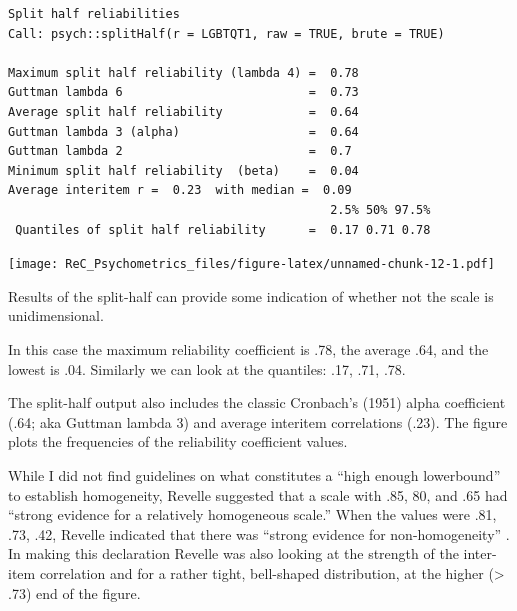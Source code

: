 \documentclass[
  english,
]{book}
\newenvironment{Shaded}{\begin{snugshade}}{\end{snugshade}}
\newcommand{\AttributeTok}[1]{\textcolor[rgb]{0.77,0.63,0.00}{#1}}
\newcommand{\DecValTok}[1]{\textcolor[rgb]{0.00,0.00,0.81}{#1}}
\newcommand{\FunctionTok}[1]{\textcolor[rgb]{0.00,0.00,0.00}{#1}}
\newcommand{\NormalTok}[1]{#1}
\newcommand{\SpecialCharTok}[1]{\textcolor[rgb]{0.00,0.00,0.00}{#1}}
\newcommand{\StringTok}[1]{\textcolor[rgb]{0.31,0.60,0.02}{#1}}
\begin{document}
\begin{verbatim}
Split half reliabilities  
Call: psych::splitHalf(r = LGBTQT1, raw = TRUE, brute = TRUE)

Maximum split half reliability (lambda 4) =  0.78
Guttman lambda 6                          =  0.73
Average split half reliability            =  0.64
Guttman lambda 3 (alpha)                  =  0.64
Guttman lambda 2                          =  0.7
Minimum split half reliability  (beta)    =  0.04
Average interitem r =  0.23  with median =  0.09
                                             2.5% 50% 97.5%
 Quantiles of split half reliability      =  0.17 0.71 0.78
\end{verbatim}

\begin{Shaded}
\end{Shaded}

\texttt{[image: ReC\_Psychometrics\_files/figure-latex/unnamed-chunk-12-1.pdf]}

Results of the split-half can provide some indication of whether not the scale is unidimensional.

In this case the maximum reliability coefficient is .78, the average .64, and the lowest is .04. Similarly we can look at the quantiles: .17, .71, .78.

The split-half output also includes the classic Cronbach's (1951) alpha coefficient (.64; aka Guttman lambda 3) and average interitem correlations (.23). The figure plots the frequencies of the reliability coefficient values.

While I did not find guidelines on what constitutes a ``high enough lowerbound'' to establish homogeneity, Revelle suggested that a scale with .85, 80, and .65 had ``strong evidence for a relatively homogeneous scale.'' When the values were .81, .73, .42, Revelle indicated that there was ``strong evidence for non-homogeneity'' \citep[p.~11]{revelle_reliability_2019}. In making this declaration Revelle was also looking at the strength of the inter-item correlation and for a rather tight, bell-shaped distribution, at the higher (\textgreater{} .73) end of the figure.
\end{document}
